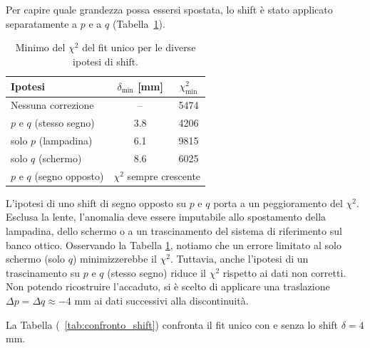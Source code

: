 \documentclass[10pt,twocolumn]{article}
\begin{document}
\noindent Per capire quale grandezza possa essersi spostata, lo shift è stato applicato separatamente a $p$ e a $q$ (Tabella~\ref{tab:ipotesi_shift}).
 
\begin{table}[H]
    \centering
    \small
    
    \begin{tabular}{lcc}
        \toprule
        \textbf{Ipotesi} & $\delta_\mathrm{min}$ [mm] & $\chi^2_\mathrm{min}$ \\
        \midrule
        Nessuna correzione        & --  & 5474 \\
        $p$ e $q$ (stesso segno)  & 3.8 & 4206 \\
        solo $p$ (lampadina)      & 6.1 & 9815 \\
        solo $q$ (schermo)        & 8.6 & 6025 \\
        $p$ e $q$ (segno opposto) & \multicolumn{2}{c}{$\chi^2$ sempre crescente} \\
        \bottomrule
    \end{tabular}
    \caption{Minimo del $\chi^2$ del fit unico per le diverse ipotesi di shift.}
    \label{tab:ipotesi_shift}
\end{table}
 
\noindent L'ipotesi di uno shift di segno opposto su $p$ e $q$ porta a un peggioramento del $\chi^2$. 
\noindent Esclusa la lente, l'anomalia deve essere imputabile allo spostamento della lampadina, dello schermo o a un trascinamento del sistema di riferimento sul banco ottico. Osservando la Tabella \ref{tab:ipotesi_shift}, notiamo che un errore limitato al solo schermo (solo $q$) minimizzerebbe il $\chi^2$. Tuttavia, anche l'ipotesi di un trascinamento su $p$ e $q$ (stesso segno) riduce il $\chi^2$ rispetto ai dati non corretti. Non potendo ricostruire l'accaduto, si è scelto di applicare una traslazione $\Delta p = \Delta q \approx -4$ mm ai dati successivi alla discontinuità.

\noindent La Tabella (~\ref{tab:confronto_shift}) confronta il fit unico con e senza lo shift $\delta=4$ mm.
 
\end{document}
